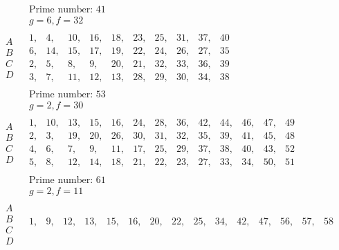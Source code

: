 \documentclass[twoside,12pt]{memoir}
\begin{document}
\[\begin{aligned}
& \begin{array}{c} \text{Prime number: }41 \\  g=6, f=32 \end{array} \\
\begin{array}{l} A \\ B \\ C \\D \end{array} &  
\begin{array}{|rrrrrrrrrr} 
1,&4,&10,&16,&18,&23,&25,&31,&37,&40 \\ 
6,& 14,&15,&17,&19,&22,&24,&26,&27,&35 \\ 
2,& 5,& 8,&9,&20,&21,&32,&33,&36,&39 \\ 
3,&7,&11,& 12,& 13,&28,&29,& 30,&34,&38
\end{array}  \\
& \begin{array}{c} \text{Prime number: }53 \\  g=2, f=30 \end{array} \\
\begin{array}{l} A \\ B \\ C \\D \end{array} &  
\begin{array}{|rrrrrrrrrrrrr} 
1,&10,&13,&15,&16,&24,&28,&36,&42,&44,&46,&47,&49 \\ 
2,&3,& 19,&20,&26,&30,&31,&32,&35,&39,&41,&45,&48 \\ 
4,& 6,& 7,&9,&11,&17,&25,&29,&37,&38,&40,&43,&52 \\ 
5,&8,&12,&14,&18,&21,&22,& 23,&27,&33,&34,&50,&51
\end{array} \\
& \begin{array}{c} \text{Prime number: }61 \\  g=2, f=11 \end{array} \\
\begin{array}{l} A \\ B \\ C \\D \end{array} &  
\begin{array}{|rrrrrrrrrrrrrrr} 
1,&9,&12,&13,&15,&16,&20,&22,&25,&34,&42,&47,&56,&57,&58 \\ 

\end{array}
\end{aligned}\]
\end{document}
